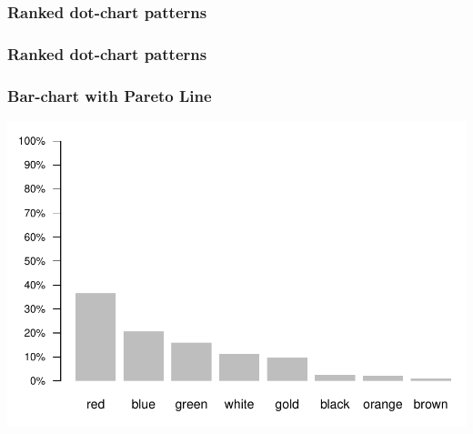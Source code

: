\documentclass[12pt]{beamer}\usepackage[]{graphicx}\usepackage[]{color}
\newenvironment{knitrout}{}{} %
\begin{document}

\begin{frame}
\frametitle{Ranked dot-chart patterns}
\begin{center}
\end{center}
\end{frame}


\begin{frame}
\frametitle{Ranked dot-chart patterns}
\begin{center}
\end{center}
\end{frame}


\begin{frame}
\begin{center}
\Huge{}
\end{center}
\end{frame}


\begin{frame}[fragile]
\frametitle{Bar-chart with Pareto Line}

\begin{knitrout}\footnotesize
{}\color{fgcolor}

{\centering \includegraphics[width=.8\linewidth,height=.6\linewidth]{figure/unnamed-chunk-11-1} 

}



\end{knitrout}

\end{frame}
\end{document}
